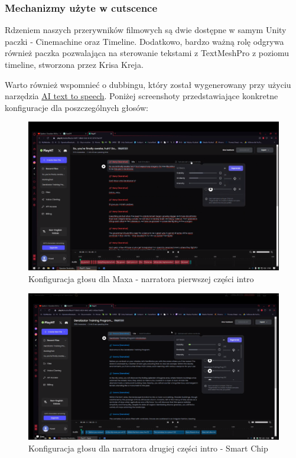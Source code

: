\subsubsection{Mechanizmy użyte w cutscence}
Rdzeniem naszych przerywników filmowych są dwie dostępne w samym Unity paczki - Cinemachine oraz Timeline.
Dodatkowo, bardzo ważną rolę odgrywa również paczka pozwalająca na sterowanie tekstami z TextMeshPro z poziomu timeline, stworzona przez Krisa Kreja.

Warto również wspomnieć o dubbingu, który został wygenerowany przy użyciu narzędzia \href{https://play.ht/}{AI text to speech}.
Poniżej screenshoty przedstawiające konkretne konfiguracje dla poszczególnych głosów:
\begin{figure}[h]
    \centering
    \includegraphics[width=1\linewidth]{Images/voice_max.PNG}
    \caption{Konfiguracja głosu dla Maxa - narratora pierwszej części intro}
\end{figure}
\begin{figure}[h]
    \centering
    \includegraphics[width=1\linewidth]{Images/voice_intro_chip.png}
    \caption{Konfiguracja głosu dla narratora drugiej części intro - Smart Chip}
\end{figure}
